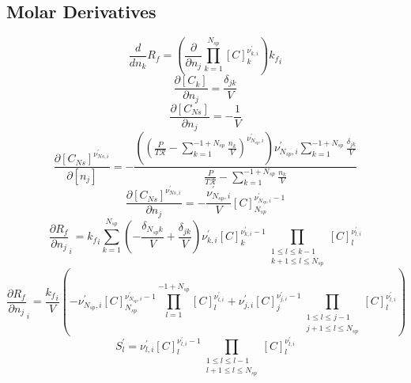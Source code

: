 \documentclass[a4paper,10pt]{article}
\newcommand{\ns}{N_{sp}}
\newcommand{\Ru}{\mathcal{R}}
\begin{document}
\subsection{Molar Derivatives}
\begin{dmath} \frac{d}{d n_{k}} {R_f} = \left(\frac{\partial}{\partial n_{j}} \prod_{k=1}^{\ns} [C]_{k}^{\nu^{\prime}_{k,i}}\right) {k_f}_{i}\end{dmath} 
\begin{dmath} \frac{\partial [C_k]}{\partial n_j} =\frac{\delta_{j k}}{V}\end{dmath} 
\begin{dmath} \frac{\partial [C_{Ns}]}{\partial n_j} =- \frac{1}{V}\end{dmath} 
\begin{dmath} \frac{\partial [C_{Ns}]^{\nu^{\prime}_{Ns, i}}}{\partial [n_j]} =- \frac{\left(\left(\frac{P}{T \Ru} - \sum_{k=1}^{-1 + \ns} \frac{n_{k}}{V}\right)^{\nu^{\prime}_{\ns,i}}\right) \nu^{\prime}_{\ns,i} \sum_{k=1}^{-1 + \ns} \frac{\delta_{j k}}{V}}{\frac{P}{T \Ru} - \sum_{k=1}^{-1 + \ns} \frac{n_{k}}{V}}\end{dmath} 
\begin{dmath} \frac{\partial [C_{Ns}]^{\nu^{\prime}_{Ns, i}}}{\partial n_j} =- \frac{\nu^{\prime}_{\ns,i}}{V} [C]_{\ns}^{\nu^{\prime}_{\ns,i} - 1}\end{dmath} 
\begin{dmath} \frac{\partial {R_f} }{\partial {n_j} }_{i} = {k_f}_{i} \sum_{k=1}^{\ns} \left(- \frac{\delta_{\ns k}}{V} + \frac{\delta_{j k}}{V}\right) \nu^{\prime}_{k,i} [C]_{k}^{\nu^{\prime}_{k,i} - 1} \prod_{\substack{1 \leq l \leq k - 1\\k + 1 \leq l \leq \ns}} [C]_{l}^{\nu^{\prime}_{l,i}}\end{dmath} 
\begin{dmath} \frac{\partial {R_f} }{\partial {n_j} }_{i} = \frac{{k_f}_{i}}{V} \left(- \nu^{\prime}_{\ns,i} [C]_{\ns}^{\nu^{\prime}_{\ns,i} - 1} \prod_{l=1}^{-1 + \ns} [C]_{l}^{\nu^{\prime}_{l,i}} + \nu^{\prime}_{j,i} [C]_{j}^{\nu^{\prime}_{j,i} - 1} \prod_{\substack{1 \leq l \leq j - 1\\j + 1 \leq l \leq \ns}} [C]_{l}^{\nu^{\prime}_{l,i}}\right)\end{dmath} 
\begin{dmath} S^{\prime}_{l} = \nu^{\prime}_{l,i} [C]_{l}^{\nu^{\prime}_{l,i} - 1} \prod_{\substack{1 \leq l \leq l - 1\\l + 1 \leq l \leq \ns}} [C]_{l}^{\nu^{\prime}_{l,i}}\end{dmath} 
\end{document}

